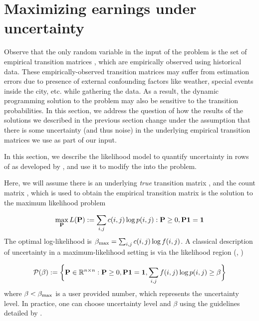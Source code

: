 

\section{Maximizing earnings under uncertainty}
\label{sec:sensitivity}
Observe that the only random variable in the input of the {\theproblem} problem
is the set of empirical transition matrices {\empiricaltransitionmatrix}, which are empirically
observed using historical data. These empirically-observed transition matrices may suffer from estimation errors due to presence of external confounding factors like weather, special events inside the city, etc. while gathering the data. As a result, the dynamic programming solution to the {\theproblem} problem
may also be sensitive to the transition probabilities. In this section, we
address the question of how the results of the solutions we described in the previous section change under the assumption that there is some uncertainty (and thus noise) in
the underlying empirical transition matrices we use as part of our input.

In this section, we describe the likelihood model to quantify uncertainty in rows of {\empiricaltransitionmatrix} as developed by \citet{nilim2004robustness}, and use it to modify the {\theproblem} into the {\robustproblem} problem.


Here, we will assume there is an underlying \emph{true} transition matrix
{\truetransitionmatrix}, and the count matrix {\countmatrix}, which is used to 
obtain the empirical transition matrix {\empiricaltransitionmatrix} is the solution
to the maximum likelihood problem

\begin{equation}
\max_{\mathbf{P}} L({\mathbf{P}}) := \sum_{i,j}c(i,j) \log{p(i,j)} : {\mathbf{P}} \geq 0, {\mathbf{P}}\mathbf{1} = \mathbf{1} 
\end{equation}
The optimal log-likelihood is $\beta_{\textrm{max}}= \sum_{i,j}c(i,j)\log{f(i,j)}$.
A classical description of uncertainty in a maximum-likelihood setting is via the likelihood region (\citet{lehmann2006theory}, \citet{poor2013introduction})

\begin{equation*}
\mathcal{P}(\beta) := \bigg\{{\mathbf{P}} \in \mathbb{R}^{n \times n}: {\mathbf{P}} \geq 0, {\mathbf{P}} \mathbf{1}=\mathbf{1}, \sum_{i,j}f(i,j)\log{p(i,j)} \geq \beta\bigg\} \label{eq:likelihood_region}
\end{equation*}
where $\beta < \beta_{\textrm{max}}$ is a user provided number, which represents the uncertainty level. In practice, one can choose uncertainty level and $\beta$ using the guidelines detailed by \citet{nilim2004robustness}.


